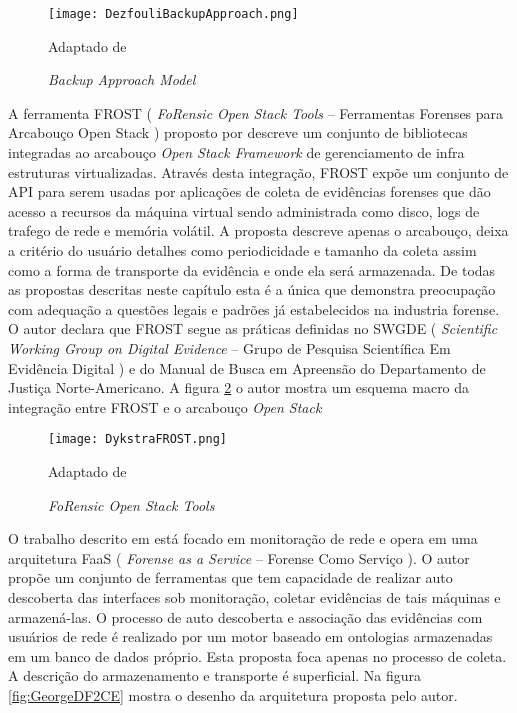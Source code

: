 \begin{figure}[htb!]
\footnotesize
\caption{\textit{Backup Approach Model}}
\texttt{[image: DezfouliBackupApproach.png]}
\centering
\label{fig:DezfouliBackupApproach}
\begin{center}
Adaptado de \cite{DezfouliBackupApproach:2012} 
\end{center}
\end{figure}

A ferramenta FROST ( \textit{FoRensic Open Stack Tools} -- Ferramentas Forenses para Arcabouço Open Stack ) proposto por \cite{DykstraFROST:2013} descreve um conjunto de bibliotecas integradas ao arcabouço \textit{Open Stack Framework} de gerenciamento de infra estruturas virtualizadas.
%
Através desta integração, FROST expõe um conjunto de API para serem usadas por aplicações de coleta de evidências forenses que dão acesso a recursos da máquina virtual sendo administrada como disco, logs de trafego de rede e memória volátil.
%
A proposta descreve apenas o arcabouço, deixa a critério do usuário detalhes como periodicidade e tamanho da coleta assim como a forma de transporte da evidência e onde ela será armazenada.
%
De todas as propostas descritas neste capítulo esta é a única que demonstra preocupação com adequação a questões legais e padrões já estabelecidos na industria forense.
%
O autor declara que FROST segue as práticas definidas no SWGDE ( \textit{Scientific Working Group on Digital Evidence} -- Grupo de Pesquisa Scientífica Em Evidência Digital ) e do Manual de Busca em Apreensão do Departamento de Justiça Norte-Americano.
%
A figura \ref{fig:DykstraFROST} o autor mostra um esquema macro da integração entre FROST e o arcabouço \textit{Open Stack}

\begin{figure}[htb!]
\footnotesize
\caption{\textit{FoRensic Open Stack Tools}}
\texttt{[image: DykstraFROST.png]}
\centering
\label{fig:DykstraFROST}
\begin{center}
Adaptado de \cite{DykstraFROST:2013} 
\end{center}
\end{figure}
%

O trabalho descrito em \cite{GeorgeDF2CE:2012} está focado em monitoração de rede e opera em uma arquitetura FaaS ( \textit{Forense as a Service} -- Forense Como Serviço ). 
%
O autor propõe um conjunto de ferramentas que tem capacidade de realizar auto descoberta das interfaces sob monitoração, coletar evidências de tais máquinas e armazená-las.
%
O processo de auto descoberta e associação das evidências com usuários de rede é realizado por um motor baseado em ontologias armazenadas em um banco de dados próprio.
%
Esta proposta foca apenas no processo de coleta. A descrição do armazenamento e transporte é superficial.
%
Na figura \ref{fig:GeorgeDF2CE} mostra o desenho da arquitetura proposta pelo autor.

